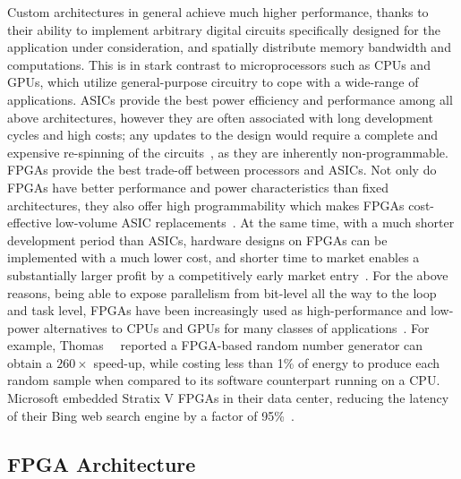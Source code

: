 Custom architectures in general achieve much higher performance, thanks to
their ability to implement arbitrary digital circuits specifically designed for
the application under consideration, and spatially distribute memory bandwidth
and computations.  This is in stark contrast to microprocessors such as CPUs
and GPUs, which utilize general-purpose circuitry to cope with a wide-range
of applications.  ASICs provide the best power efficiency and performance
among all above architectures, however they are often associated with long
development cycles and high costs; any updates to the design would require a
complete and expensive re-spinning of the circuits~\cite{bacon13}, as they
are inherently non-programmable.  FPGAs provide the best trade-off between
processors and ASICs.  Not only do FPGAs have better performance and power
characteristics than fixed architectures, they also offer high programmability
which makes FPGAs cost-effective low-volume ASIC replacements~\cite{karen04,
bacon13}.  At the same time, with a much shorter development period than ASICs,
hardware designs on FPGAs can be implemented with a much lower cost, and
shorter time to market enables a substantially larger profit by a competitively
early market entry~\cite{semico12}.  For the above reasons, being able to
expose parallelism from bit-level all the way to the loop and task level, FPGAs
have been increasingly used as high-performance and low-power alternatives to
CPUs and GPUs for many classes of applications~\cite{bacon13, brodtkorb10,
sirowy08}.  For example, Thomas~\etal~\cite{thomas09} reported a FPGA-based
random number generator can obtain a $260\times$ speed-up, while costing less
than 1\% of energy to produce each random sample when compared to its software
counterpart running on a CPU\@.  Microsoft embedded Stratix V FPGAs in their
data center, reducing the latency of their Bing web search engine by a factor
of 95\%~\cite{catapult}.


\subsection{FPGA Architecture}
\label{bg:sub:fpga_architecture}

